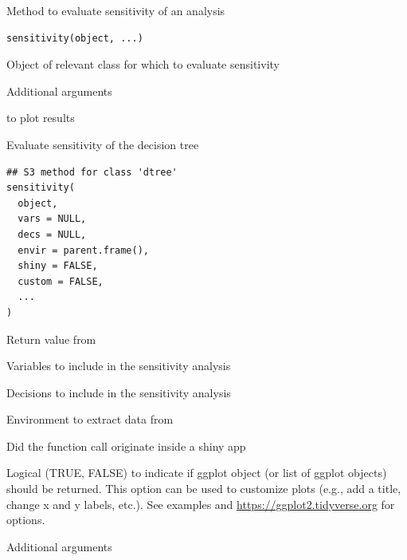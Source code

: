 \documentclass[a4paper]{book}
\begin{document}
%
\begin{Description}
Method to evaluate sensitivity of an analysis
\end{Description}
%
\begin{Usage}
\begin{verbatim}
sensitivity(object, ...)
\end{verbatim}
\end{Usage}
%
\begin{Arguments}
\begin{ldescription}
\item[\code{object}] Object of relevant class for which to evaluate sensitivity

\item[\code{...}] Additional arguments
\end{ldescription}
\end{Arguments}
%
\begin{SeeAlso}
 to plot results
\end{SeeAlso}
%
\begin{Description}
Evaluate sensitivity of the decision tree
\end{Description}
%
\begin{Usage}
\begin{verbatim}
## S3 method for class 'dtree'
sensitivity(
  object,
  vars = NULL,
  decs = NULL,
  envir = parent.frame(),
  shiny = FALSE,
  custom = FALSE,
  ...
)
\end{verbatim}
\end{Usage}
%
\begin{Arguments}
\begin{ldescription}
\item[\code{object}] Return value from 

\item[\code{vars}] Variables to include in the sensitivity analysis

\item[\code{decs}] Decisions to include in the sensitivity analysis

\item[\code{envir}] Environment to extract data from

\item[\code{shiny}] Did the function call originate inside a shiny app

\item[\code{custom}] Logical (TRUE, FALSE) to indicate if ggplot object (or list of ggplot objects) should be returned. This option can be used to customize plots (e.g., add a title, change x and y labels, etc.). See examples and \url{https://ggplot2.tidyverse.org} for options.

\item[\code{...}] Additional arguments
\end{ldescription}
\end{Arguments}
\end{document}

